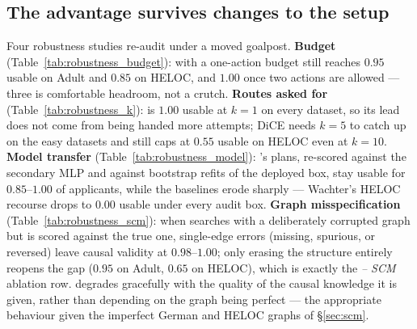 

\subsection{The advantage survives changes to the setup}
\label{sec:exp:robust}
Four robustness studies re-audit \cac{} under a moved goalpost.
\textbf{Budget} (Table~\ref{tab:robustness_budget}): with a one-action budget
\cac{} still reaches $0.95$ usable on Adult and $0.85$ on HELOC, and $1.00$ once
two actions are allowed --- three is comfortable headroom, not a crutch.
\textbf{Routes asked for} (Table~\ref{tab:robustness_k}): \cac{} is $1.00$ usable
at $k=1$ on every dataset, so its lead does not come from being handed more
attempts; DiCE needs $k=5$ to catch up on the easy datasets and still caps at
$0.55$ usable on HELOC even at $k=10$.
\textbf{Model transfer} (Table~\ref{tab:robustness_model}): \cac{}'s plans,
re-scored against the secondary MLP and against bootstrap refits of the deployed
box, stay usable for $0.85$--$1.00$ of applicants, while the baselines erode
sharply --- Wachter's HELOC recourse drops to $0.00$ usable under every audit box.
\textbf{Graph misspecification} (Table~\ref{tab:robustness_scm}): when \cac{}
searches with a deliberately corrupted graph but is scored against the true one,
single-edge errors (missing, spurious, or reversed) leave causal validity at
$0.98$--$1.00$; only erasing the structure entirely reopens the gap ($0.95$ on
Adult, $0.65$ on HELOC), which is exactly the \emph{-- SCM} ablation row. \cac{}
degrades gracefully with the quality of the causal knowledge it is given, rather
than depending on the graph being perfect --- the appropriate behaviour given the
imperfect German and HELOC graphs of \S\ref{sec:scm}.





